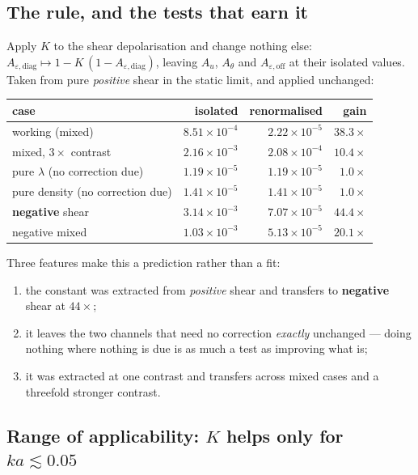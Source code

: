 \documentclass[11pt,a4paper]{article}
\newcommand{\Kren}{K}
\begin{document}
\subsection{The rule, and the tests that earn it}

Apply $\Kren$ to the shear depolarisation and change nothing else:
$A_{\varepsilon,\text{diag}} \mapsto 1-\Kren\,(1-A_{\varepsilon,\text{diag}})$,
leaving $A_u$, $A_\theta$ and $A_{\varepsilon,\text{off}}$ at their isolated
values. Taken from pure \emph{positive} shear in the static limit, and applied
unchanged:

\begin{center}
\begin{tabular}{lrrr}
\toprule
case & isolated & renormalised & gain \\
\midrule
working (mixed) & $8.51\times10^{-4}$ & $2.22\times10^{-5}$ & $38.3\times$ \\
mixed, $3\times$ contrast & $2.16\times10^{-3}$ & $2.08\times10^{-4}$ & $10.4\times$ \\
pure $\lambda$ (no correction due) & $1.19\times10^{-5}$ & $1.19\times10^{-5}$ & $1.0\times$ \\
pure density (no correction due) & $1.41\times10^{-5}$ & $1.41\times10^{-5}$ & $1.0\times$ \\
\textbf{negative} shear & $3.14\times10^{-3}$ & $7.07\times10^{-5}$ & $44.4\times$ \\
negative mixed & $1.03\times10^{-3}$ & $5.13\times10^{-5}$ & $20.1\times$ \\
\bottomrule
\end{tabular}
\end{center}

Three features make this a prediction rather than a fit:
\begin{enumerate}[nosep]
  \item the constant was extracted from \emph{positive} shear and transfers to
    \textbf{negative} shear at $44\times$;
  \item it leaves the two channels that need no correction \emph{exactly}
    unchanged --- doing nothing where nothing is due is as much a test as
    improving what is;
  \item it was extracted at one contrast and transfers across mixed cases and a
    threefold stronger contrast.
\end{enumerate}

\subsection{Range of applicability: $\Kren$ helps only for $ka \lesssim 0.05$}
\label{sec:ka-limit}
\end{document}
